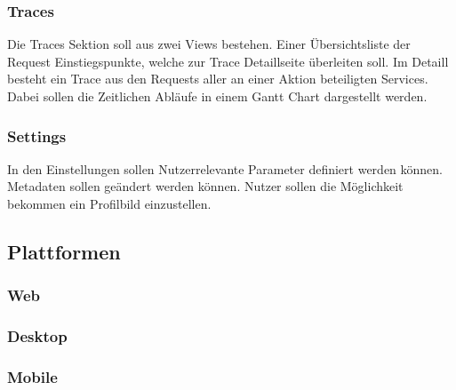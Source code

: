 \subsubsection{Traces}

Die Traces Sektion soll aus zwei Views bestehen. Einer Übersichtsliste der Request Einstiegspunkte,
welche zur Trace Detaillseite überleiten soll. Im Detaill besteht ein Trace aus den Requests
aller an einer Aktion beteiligten Services. Dabei sollen die Zeitlichen Abläufe in einem Gantt Chart dargestellt werden.

\subsubsection{Settings}

In den Einstellungen sollen Nutzerrelevante Parameter definiert werden können. Metadaten sollen geändert werden können.
Nutzer sollen die Möglichkeit bekommen ein Profilbild einzustellen.


\subsection{Plattformen}
\subsubsection{Web}
\subsubsection{Desktop}
\subsubsection{Mobile}
